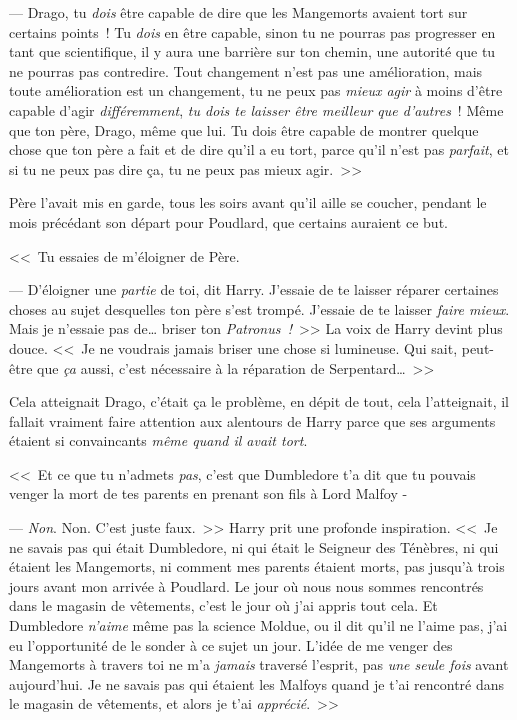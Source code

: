 --- Drago, tu \emph{dois} être capable de dire que les Mangemorts avaient tort sur certains points~! Tu \emph{dois} en être capable, sinon tu ne pourras pas progresser en tant que scientifique, il y aura une barrière sur ton chemin, une autorité que tu ne pourras pas contredire. Tout changement n'est pas une amélioration, mais toute amélioration est un changement, tu ne peux pas \emph{mieux agir} à moins d'être capable d'agir \emph{différemment}, \emph{tu dois te laisser être meilleur que d'autres}~! Même que ton père, Drago, même que lui. Tu dois être capable de montrer quelque chose que ton père a fait et de dire qu'il a eu tort, parce qu'il n'est pas \emph{parfait}, et si tu ne peux pas dire ça, tu ne peux pas mieux agir.~>>

Père l'avait mis en garde, tous les soirs avant qu'il aille se coucher, pendant le mois précédant son départ pour Poudlard, que certains auraient ce but.

<<~Tu essaies de m'éloigner de Père.

--- D'éloigner une \emph{partie} de toi, dit Harry. J'essaie de te laisser réparer certaines choses au sujet desquelles ton père s'est trompé. J'essaie de te laisser \emph{faire mieux}. Mais je n'essaie pas de… briser ton \emph{Patronus~!}~>> La voix de Harry devint plus douce. <<~Je ne voudrais jamais briser une chose si lumineuse. Qui sait, peut-être que \emph{ça} aussi, c'est nécessaire à la réparation de Serpentard…~>>

Cela atteignait Drago, c'était ça le problème, en dépit de tout, cela l'atteignait, il fallait vraiment faire attention aux alentours de Harry parce que ses arguments étaient si convaincants \emph{même quand il avait tort}.

<<~Et ce que tu n'admets \emph{pas}, c'est que Dumbledore t'a dit que tu pouvais venger la mort de tes parents en prenant son fils à Lord Malfoy -

--- \emph{Non}. Non. C'est juste faux.~>> Harry prit une profonde inspiration. <<~Je ne savais pas qui était Dumbledore, ni qui était le Seigneur des Ténèbres, ni qui étaient les Mangemorts, ni comment mes parents étaient morts, pas jusqu'à trois jours avant mon arrivée à Poudlard. Le jour où nous nous sommes rencontrés dans le magasin de vêtements, c'est le jour où j'ai appris tout cela. Et Dumbledore \emph{n'aime} même pas la science Moldue, ou il dit qu'il ne l'aime pas, j'ai eu l'opportunité de le sonder à ce sujet un jour. L'idée de me venger des Mangemorts à travers toi ne m'a \emph{jamais} traversé l'esprit, pas \emph{une seule fois} avant aujourd'hui. Je ne savais pas qui étaient les Malfoys quand je t'ai rencontré dans le magasin de vêtements, et alors je t'ai \emph{apprécié}.~>>

